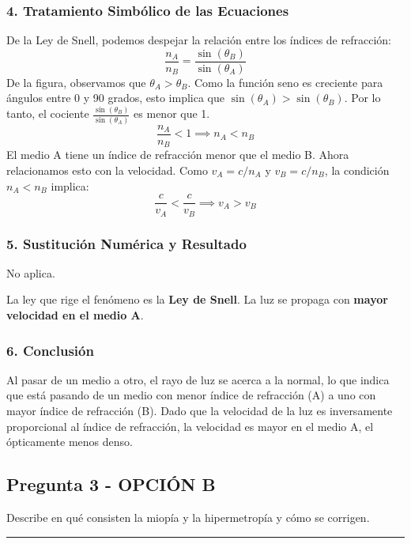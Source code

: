 \subsubsection*{4. Tratamiento Simbólico de las Ecuaciones}
De la Ley de Snell, podemos despejar la relación entre los índices de refracción:
$$\frac{n_A}{n_B} = \frac{\sin(\theta_B)}{\sin(\theta_A)}$$
De la figura, observamos que $\theta_A > \theta_B$. Como la función seno es creciente para ángulos entre 0 y 90 grados, esto implica que $\sin(\theta_A) > \sin(\theta_B)$.
Por lo tanto, el cociente $\frac{\sin(\theta_B)}{\sin(\theta_A)}$ es menor que 1.
$$\frac{n_A}{n_B} < 1 \implies n_A < n_B$$
El medio A tiene un índice de refracción menor que el medio B.
Ahora relacionamos esto con la velocidad. Como $v_A = c/n_A$ y $v_B = c/n_B$, la condición $n_A < n_B$ implica:
$$\frac{c}{v_A} < \frac{c}{v_B} \implies v_A > v_B$$

\subsubsection*{5. Sustitución Numérica y Resultado}
No aplica.
\begin{cajaresultado}
La ley que rige el fenómeno es la \textbf{Ley de Snell}. La luz se propaga con \textbf{mayor velocidad en el medio A}.
\end{cajaresultado}

\subsubsection*{6. Conclusión}
\begin{cajaconclusion}
Al pasar de un medio a otro, el rayo de luz se acerca a la normal, lo que indica que está pasando de un medio con menor índice de refracción (A) a uno con mayor índice de refracción (B). Dado que la velocidad de la luz es inversamente proporcional al índice de refracción, la velocidad es mayor en el medio A, el ópticamente menos denso.
\end{cajaconclusion}

\newpage

\subsection{Pregunta 3 - OPCIÓN B}
\label{subsec:3B_2003_sep_ext}

\begin{cajaenunciado}
Describe en qué consisten la miopía y la hipermetropía y cómo se corrigen.
\end{cajaenunciado}
\hrule

